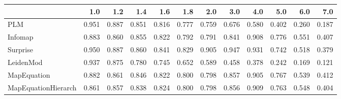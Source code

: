 \begin{tabular}{lrrrrrrrrrrr}
\toprule
{} &   1.0 &   1.2 &   1.4 &   1.6 &   1.8 &   2.0 &   3.0 &   4.0 &   5.0 &   6.0 &   7.0 \\
\midrule
PLM                 & 0.951 & 0.887 & 0.851 & 0.816 & 0.777 & 0.759 & 0.676 & 0.580 & 0.402 & 0.260 & 0.187 \\
Infomap             & 0.883 & 0.860 & 0.855 & 0.822 & 0.792 & 0.791 & 0.841 & 0.908 & 0.776 & 0.551 & 0.407 \\
Surprise            & 0.950 & 0.887 & 0.860 & 0.841 & 0.829 & 0.905 & 0.947 & 0.931 & 0.742 & 0.518 & 0.379 \\
LeidenMod           & 0.937 & 0.875 & 0.780 & 0.745 & 0.652 & 0.589 & 0.458 & 0.378 & 0.242 & 0.169 & 0.121 \\
MapEquation         & 0.882 & 0.861 & 0.846 & 0.822 & 0.800 & 0.798 & 0.857 & 0.905 & 0.767 & 0.539 & 0.412 \\
MapEquationHierarch & 0.861 & 0.857 & 0.838 & 0.824 & 0.800 & 0.798 & 0.856 & 0.909 & 0.763 & 0.548 & 0.404 \\
\bottomrule
\end{tabular}
